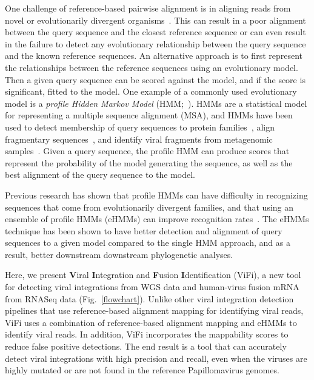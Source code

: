 \documentclass[10pt]{article}
\begin{document}
One challenge of reference-based pairwise alignment is in aligning reads from novel or evolutionarily divergent organisms~\cite{Brenner1998,Park1998}.  This can result in a poor alignment between the query sequence and the closest reference sequence or can even result in the failure to detect any evolutionary relationship between the query sequence and the known reference sequences.  An alternative approach is to first represent the relationships between the reference sequences using an evolutionary model.  Then a given query sequence can be scored against the model, and if the score is significant, fitted to the model.  One example of a commonly used evolutionary model is a \emph{profile Hidden Markov Model} (HMM;~\cite{Eddy1998}). HMMs are a statistical model for representing a multiple sequence alignment (MSA), and HMMs have been used to detect membership of query sequences to protein families~\cite{Finn2010}, align fragmentary sequences~\cite{Eddy1998}, and identify viral fragments from metagenomic samples~\cite{Skewes-Cox2014}.  Given a query sequence, the profile HMM can produce scores that represent the probability of the model generating the sequence, as well as the best alignment of the query sequence to the model.

Previous research has shown that profile HMMs can have difficulty in recognizing sequences that come from evolutionarily divergent families, and that using an ensemble of profile HMMs (eHMMs) can improve recognition rates~\cite{Mirarab2012,Nguyen2014,Nguyen2015,Nguyen2016_hippi}.  The eHMMs technique has been shown to have better detection and alignment of query sequences to a given model compared to the single HMM approach, and as a result, better downstream downstream phylogenetic analyses. 

Here, we present \textbf{V}iral \textbf{I}ntegration and \textbf{F}usion \textbf{I}dentification (ViFi), a new tool for detecting viral integrations from WGS data and human-virus fusion mRNA from RNASeq data (Fig.~\ref{flowchart}).  Unlike other viral integration detection pipelines that use reference-based alignment mapping for identifying viral reads, ViFi uses a combination of reference-based alignment mapping and eHMMs to identify viral reads.  In addition, ViFi incorporates the mappability scores to reduce false positive detections.  The end result is a tool that can accurately detect viral integrations with high precision and recall, even when the viruses are highly mutated or are not found in the reference Papillomavirus genomes.  
\end{document}
